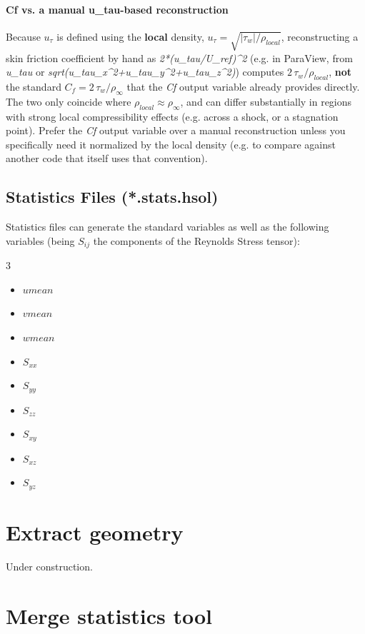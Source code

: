 \documentclass[a4paper,10pt]{report}
\begin{document}
\paragraph{Cf vs. a manual u\_tau-based reconstruction}

Because $u_\tau$ is defined using the \textbf{local} density, $u_\tau=\sqrt{|\tau_w|/\rho_{local}}$, reconstructing a skin friction coefficient by hand as \textit{2*(u\_tau/U\_ref)\textasciicircum2} (e.g. in ParaView, from \textit{u\_tau} or \textit{sqrt(u\_tau\_x\textasciicircum2+u\_tau\_y\textasciicircum2+u\_tau\_z\textasciicircum2)}) computes $2\,\tau_w/\rho_{local}$, \textbf{not} the standard $C_f = 2\,\tau_w/\rho_\infty$ that the \textit{Cf} output variable already provides directly. The two only coincide where $\rho_{local}\approx\rho_\infty$, and can differ substantially in regions with strong local compressibility effects (e.g. across a shock, or a stagnation point). Prefer the \textit{Cf} output variable over a manual reconstruction unless you specifically need it normalized by the local density (e.g. to compare against another code that itself uses that convention).

\subsection{Statistics Files (*.stats.hsol)}
Statistics files can generate the standard variables as well as the following variables (being $S_{ij}$ the components of the Reynolds Stress tensor):

\begin{multicols}{3}
\begin{itemize}
\item $umean$
\item $vmean$
\item $wmean$
\item $S_{xx}$
\item $S_{yy}$
\item $S_{zz}$
\item $S_{xy}$
\item $S_{xz}$
\item $S_{yz}$
\end{itemize}
\end{multicols}

\section{Extract geometry}
Under construction.

\section{Merge statistics tool}
\end{document}
